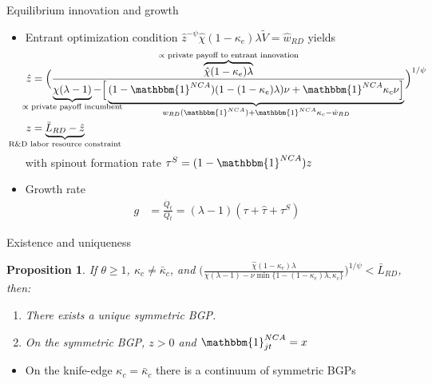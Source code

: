 \documentclass[english,usenames,dvipsnames]{beamer}
\newtheorem{proposition}{Proposition}
\begin{document}
\begin{frame}{Equilibrium innovation and growth}\label{eq_innovation_and_growth}
	\hyperlink{characterizing_BGP}{} 
	\begin{itemize}
		\item Entrant optimization condition $\hat{z}^{-\psi} \hat{\chi} (1-\kappa_e) \lambda \tilde{V}= \hat{w}_{RD}$ yields
		\begin{align*}
		\hat{z} &= \Big( \frac{ \overbrace{\hat{\chi} (1-\kappa_e) \lambda}^{\mathclap{\propto \text{ private payoff to entrant innovation}}}}{\underbrace{\chi(\lambda -1)}_{\mathclap{\propto \text{ private payoff incumbent}}} - \Big[\underbrace{(1-\mathbbm{1}^{NCA}) (1- (1-\kappa_e) \lambda)\nu + \mathbbm{1}^{NCA} \kappa_c \nu \Big]}_{\mathclap{w_{RD}(\mathbbm{1}^{NCA}) + \mathbbm{1}^{NCA} \kappa_c  - \hat{w}_{RD}}} }\Big)^{1/\psi} \\
		z &= \underbrace{\bar{L}_{RD} - \hat{z}}_{\mathclap{\text{R\&D labor resource constraint}}} 
		\end{align*}
		with spinout formation rate $\tau^S = (1-\mathbbm{1}^{NCA}) z$
		\item Growth rate
		\begin{align*}
		g &= \frac{\dot{Q}_t}{Q_t} = (\lambda - 1) (\tau + \hat{\tau} + \tau^S)
		\end{align*}
	\end{itemize}
\end{frame}


\begin{frame}{Existence and uniqueness}\label{existence_and_uniqueness}\hyperlink{characterizing_BGP}{} 
	\begin{proposition}\label{proposition:purstrategyeq:positiveOI}
		If $\theta \ge 1$, $\kappa_c \ne \bar{\kappa}_c$, and $\Big( \frac{\hat{\chi} (1-\kappa_{e}) \lambda}{\chi(\lambda-1) - \nu \min\{ 1-(1-\kappa_e) \lambda, \kappa_c \}} \Big)^{1/\psi} < \bar{L}_{RD}$, then:
		\begin{enumerate}
			\item There exists a unique symmetric BGP.
			\item On the symmetric BGP, $z > 0$ and $\mathbbm{1}^{NCA}_{jt} = x$
		\end{enumerate}
	\end{proposition}
	\begin{itemize}
		\item On the knife-edge $\kappa_c = \bar{\kappa}_c$ there is a continuum of symmetric BGPs
	\end{itemize}
\end{frame}
\end{document}
